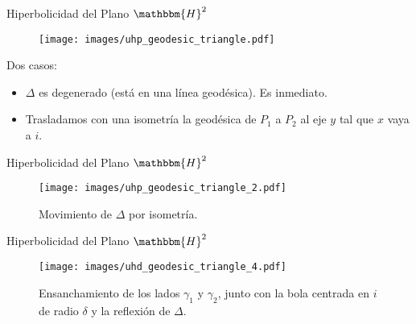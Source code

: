 \documentclass[xcolor=dvipsnames,aspectratio=159]{beamer}
\theoremstyle{largebreak}
\newcommand{\bbm}[1]{\ensuremath{\mathbbm{#1}}}
\begin{document}
\begin{frame}{Hiperbolicidad del Plano $\bbm{H}^2$}
    \begin{figure}
        \begin{center}
            \texttt{[image: images/uhp\_geodesic\_triangle.pdf]}
        \end{center}
    \end{figure}
    \pause
    Dos casos:
    \begin{itemize}
        \pause
        \item $\Delta$ es degenerado (está en una línea geodésica). Es inmediato.
        \pause
        \item Trasladamos con una isometría la geodésica de $P_1$ a $P_2$ al eje $y$ tal que $x$ vaya a $i$.
    \end{itemize}
\end{frame}


\begin{frame}{Hiperbolicidad del Plano $\bbm{H}^2$}
    \begin{figure}
        \begin{center}
            \texttt{[image: images/uhp\_geodesic\_triangle\_2.pdf]}
        \end{center}
        \caption{Movimiento de $\Delta$ por isometría.}
    \end{figure}
\end{frame}

\begin{frame}{Hiperbolicidad del Plano $\bbm{H}^2$}
    \begin{figure}
        \begin{center}
            \texttt{[image: images/uhd\_geodesic\_triangle\_4.pdf]}
        \end{center}
        \caption{Ensanchamiento de los lados $\gamma_1$ y $\gamma_2$, junto con la bola centrada en $i$ de radio $\delta$ y la reflexión de $\Delta$.}
    \end{figure}
\end{frame}
\end{document}
